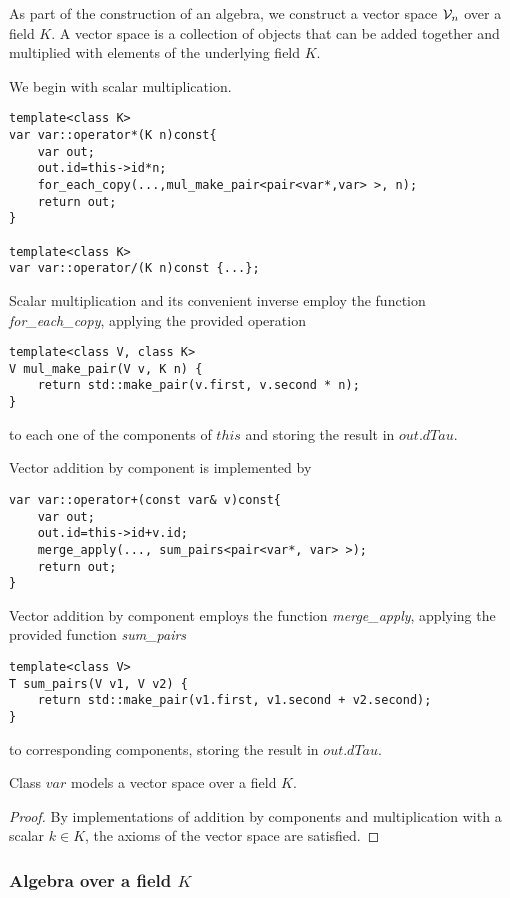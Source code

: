 As part of the construction of an algebra, we construct a vector space $\mathcal{V}_n$ over a field $K$. A vector space is a collection of objects that can be added together and multiplied with elements of the underlying field $K$.

We begin with scalar multiplication.

\begin{lstlisting}
template<class K>
var var::operator*(K n)const{
    var out;
    out.id=this->id*n;
    for_each_copy(...,mul_make_pair<pair<var*,var> >, n);
    return out;
}

template<class K>
var var::operator/(K n)const {...};
\end{lstlisting}
Scalar multiplication and its convenient inverse employ the function \emph{for\_each\_copy}, applying the provided operation 
\begin{lstlisting}
template<class V, class K>
V mul_make_pair(V v, K n) {
    return std::make_pair(v.first, v.second * n);
}
\end{lstlisting}
to each one of the components of $this$ and storing the result in $out.dTau$.

Vector addition by component is implemented by 
\begin{lstlisting}
var var::operator+(const var& v)const{
    var out;
    out.id=this->id+v.id;
    merge_apply(..., sum_pairs<pair<var*, var> >);
    return out;
}
\end{lstlisting}
Vector addition by component employs the function \emph{merge\_apply}, applying the provided function \emph{sum\_pairs}
\begin{lstlisting}
template<class V>
T sum_pairs(V v1, V v2) {
    return std::make_pair(v1.first, v1.second + v2.second);
}
\end{lstlisting}
to corresponding components, storing the result in $out.dTau$.

\begin{izrek}
Class $var$ models a vector space over a field $K$.
\end{izrek}
\begin{proof}
By implementations of addition by components and multiplication with a scalar $k\in K$, the axioms of the vector space are satisfied.
\end{proof}

\subsubsection{Algebra over a field $K$}\label{sec:algebra}

